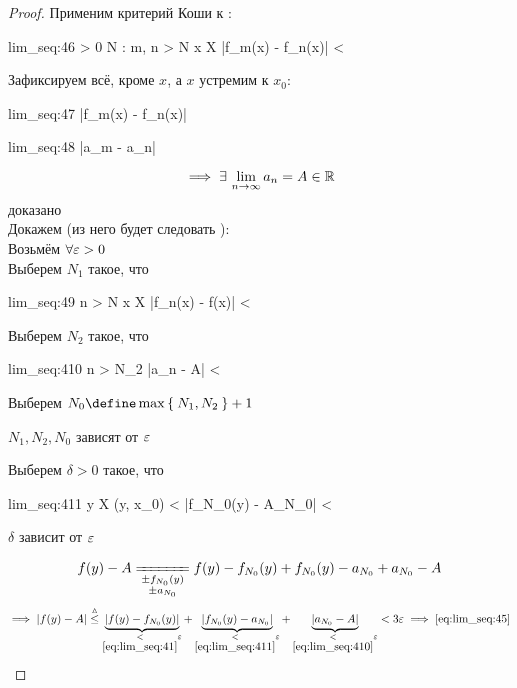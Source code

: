 \begin{proof}
	Применим критерий Коши к :
	\begin{equ}{lim_seq:46}
		\implies \forall \veps > 0 \quad \exist N : \quad \forall m, n > N \quad \forall x \in X \quad |f_m(x) - f_n(x)| < \veps
	\end{equ}
	Зафиксируем всё, кроме $ x $, а $ x $ устремим к $ x_0 $:
	\begin{equ}{lim_seq:47}
		\implies {} |f_m(x) - f_n(x)| \le \veps
	\end{equ}
	\begin{equ}{lim_seq:48}
		 |a_m - a_n| \le \veps
	\end{equ}
	$$ \implies \exists\, \lim\limits_{n\to\infty} a_n = A \in \mathbb{R} $$
	 доказано \\
	Докажем  (из него будет следовать ): \\
	Возьмём $ \forall \varepsilon > 0 $ \\
	Выберем $ N_1 $ такое, что
	\begin{equ}{lim_seq:49}
		\forall n > N \quad \forall x \in X \setminus {} \quad |f_n(x) - f(x)| < \veps
	\end{equ}
	Выберем $ N_2 $ такое, что
	\begin{equ}{lim_seq:410}
		\forall n > N_2 \quad |a_n - A| < \veps
	\end{equ}
	Выберем $ N_0 \define \max\set{N_1, N_2} + 1 $
	\begin{remark}
		$ N_1, N_2, N_0 $ зависят от $ \varepsilon $
	\end{remark}
	Выберем $ \delta > 0 $ такое, что
	\begin{equ}{lim_seq:411}
		\forall y \in X \setminus {} \quad \nimp[\bigg(] \diam(y, x_0) < \delta \implies |f_{N_0}(y) - A_{N_0}| < \veps \nimp[\bigg)]
	\end{equ}
	\begin{remark}
		$ \delta $ зависит  от $ \varepsilon $
	\end{remark}
	$$ f(y) - A \undereq{
		\begin{subarray}{c}
			\pm f_{N_0}(y) \\
			\pm a_{N_0}
		\end{subarray}} f(y) - f_{N_0}(y) + f_{N_0}(y) - a_{N_0} + a_{N_0} - A $$
	$$ \implies |f(y) - A| \trile \underbrace{|f(y) - f_{N_0}(y)|}_{\underset{\eref{lim_seq:41}}< \veps} + \underbrace{|f_{N_0}(y) - a_{N_0}|}_{\underset{\eref{lim_seq:411}}< \veps} + \underbrace{|a_{N_0} - A|}_{\underset{\eref{lim_seq:410}}< \veps} < 3\veps \implies \eref{lim_seq:45} $$
\end{proof}

